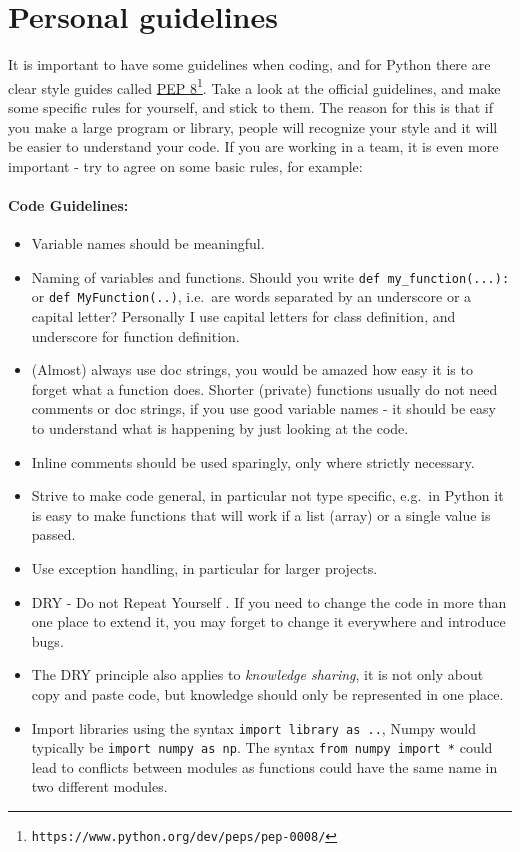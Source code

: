\documentclass[graybox,sectrefs,envcountresetchap,open=right,final]{svmonodo}
\begin{document}
\section{Personal guidelines}
It is important to have some guidelines when coding, and for Python there are clear style guides called \href{{https://www.python.org/dev/peps/pep-0008/}}{PEP 8}\footnote{\texttt{https://www.python.org/dev/peps/pep-0008/}}. Take a look at the official guidelines, and  make some specific rules for yourself, and stick to them. The reason for this is that if you make a large program or library, people will recognize your style and it will be easier to understand your code. If you are working in a team, it is even more important - try to agree on some basic rules, for example:

\paragraph{Code Guidelines:}
\begin{itemize}
\item Variable names should be meaningful.

\item Naming of variables and functions. Should you write \Verb!def my_function(...):! or \texttt{def MyFunction(..)}, i.e.~are words separated by an underscore or a capital letter? Personally I use capital letters for class definition, and underscore for function definition.

\item (Almost) always use doc strings, you would be amazed how easy it is to forget what a function does. Shorter (private) functions usually do not need comments or doc strings, if you use good variable names - it should be easy to understand what is happening by just looking at the code.

\item Inline comments should be used sparingly, only where strictly necessary.

\item Strive to make code general, in particular not type specific, e.g.~in Python it is easy to make functions that will work if a list (array) or a single value is passed.

\item Use exception handling, in particular for larger projects.

\item DRY - Do not Repeat Yourself \cite{thomas2019pragmatic}. If you need to change the code in more than one place to extend it, you may forget to change it everywhere and introduce bugs.

\item The DRY principle also applies to \emph{knowledge sharing}, it is not only about copy and paste code, but knowledge should only be represented in one place. 

\item Import libraries using the syntax \texttt{import library as ..}, Numpy would typically be \texttt{import numpy as np}. The syntax \texttt{from numpy import *} could lead to conflicts between modules as functions could have the same name in two different modules.
\end{itemize}
\end{document}
